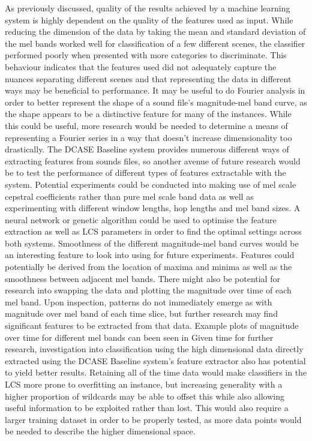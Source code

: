 \documentclass[11pt]{article}
\begin{document}
As previously discussed, quality of the results achieved by a machine learning system is highly dependent on the quality of the features used as input. While reducing the dimension of the data by taking the mean and standard deviation of the mel bands worked well for classification of a few different scenes, the classifier performed poorly when presented with more categories to discriminate. This behaviour indicates that the features used did not adequately capture the nuances separating different scenes and that representing the data in different ways may be beneficial to performance.
It may be useful to do Fourier analysis in order to better represent the shape of a sound file's magnitude-mel band curve, as the shape appears to be a distinctive feature for many of the instances. While this could be useful, more research would be needed to determine a means of representing a Fourier series in a way that doesn't increase dimensionality too drastically. 
The DCASE Baseline system provides numerous different ways of extracting features from sounds files, so another avenue of future research would be to test the performance of different types of features extractable with the system. Potential experiments could be conducted into making use of mel scale cepstral coefficients rather than pure mel scale band data as well as experimenting with different window lengths, hop lengths and mel band sizes. A neural network or genetic algorithm could be used to optimise the feature extraction as well as LCS parameters in order to find the optimal settings across both systems. 
Smoothness of the different magnitude-mel band curves would be an interesting feature to look into using for future experiments. Features could potentially be derived from the location of maxima and minima as well as the smoothness between adjacent mel bands.
There might also be potential for research into swapping the data and plotting the magnitude over time of each mel band. Upon inspection, patterns do not immediately emerge as with magnitude over mel band of each time slice, but further research may find significant features to be extracted from that data. Example plots of magnitude over time for different mel bands can been seen in 
Given time for further research, investigation into classification using the high dimensional data directly extracted using the DCASE Baseline system's feature extractor also has potential to yield better results. Retaining all of the time data would make classifiers in the LCS more prone to overfitting an instance, but increasing generality with a higher proportion of wildcards may be able to offset this while also allowing useful information to be exploited rather than lost. This would also require a larger training dataset in order to be properly tested, as more data points would be needed to describe the higher dimensional space.
\end{document}
